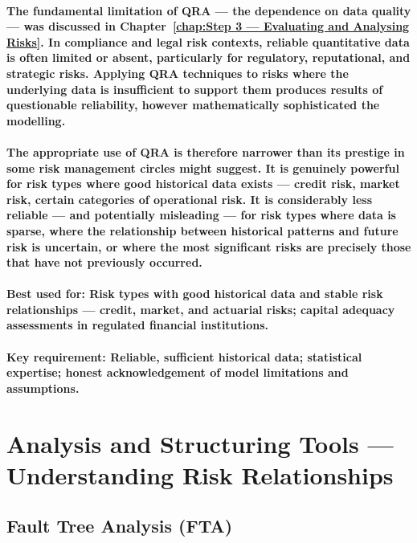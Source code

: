\paragraph{The fundamental limitation of QRA — the dependence on data quality — was discussed in Chapter~\ref{chap:Step 3 — Evaluating and Analysing Risks}. In compliance and legal risk contexts, reliable quantitative data is often limited or absent, particularly for regulatory, reputational, and strategic risks. Applying QRA techniques to risks where the underlying data is insufficient to support them produces results of questionable reliability, however mathematically sophisticated the modelling.}
\paragraph{The appropriate use of QRA is therefore narrower than its prestige in some risk management circles might suggest. It is genuinely powerful for risk types where good historical data exists — credit risk, market risk, certain categories of operational risk. It is considerably less reliable — and potentially misleading — for risk types where data is sparse, where the relationship between historical patterns and future risk is uncertain, or where the most significant risks are precisely those that have not previously occurred.}
\paragraph{\textbf{Best used for}: Risk types with good historical data and stable risk relationships — credit, market, and actuarial risks; capital adequacy assessments in regulated financial institutions.}
\paragraph{\textbf{Key requirement}: Reliable, sufficient historical data; statistical expertise; honest acknowledgement of model limitations and assumptions.}

\section{Analysis and Structuring Tools — Understanding Risk Relationships}

\subsection{Fault Tree Analysis (FTA)}
